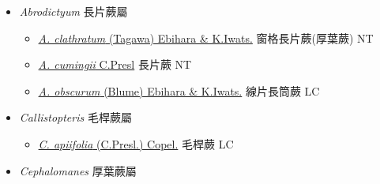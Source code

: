 
  \begin{itemize}
 \item[] \textit{Abrodictyum} 長片蕨屬
                    
  \begin{itemize}
        \item[] \href{http://www.theplantlist.org/tpl1.1/search?q=Abrodictyum+clathratum}{\textit{A. clathratum} (Tagawa) Ebihara \& K.Iwats.}     窗格長片蕨(厚葉蕨)   NT
        \item[] \href{http://www.theplantlist.org/tpl1.1/search?q=Abrodictyum+cumingii}{\textit{A. cumingii} C.Presl}   長片蕨 NT
        \item[] \href{http://www.theplantlist.org/tpl1.1/search?q=Abrodictyum+obscurum}{\textit{A. obscurum} (Blume) Ebihara \& K.Iwats.}     線片長筒蕨 LC
  \end{itemize}
 \item[] \textit{Callistopteris} 毛桿蕨屬
                    
  \begin{itemize}
        \item[] \href{http://www.theplantlist.org/tpl1.1/search?q=Callistopteris+apiifolia}{\textit{C. apiifolia} (C.Presl.) Copel.}   毛桿蕨 LC
  \end{itemize}
 \item[] \textit{Cephalomanes} 厚葉蕨屬
                    

\end{itemize}
